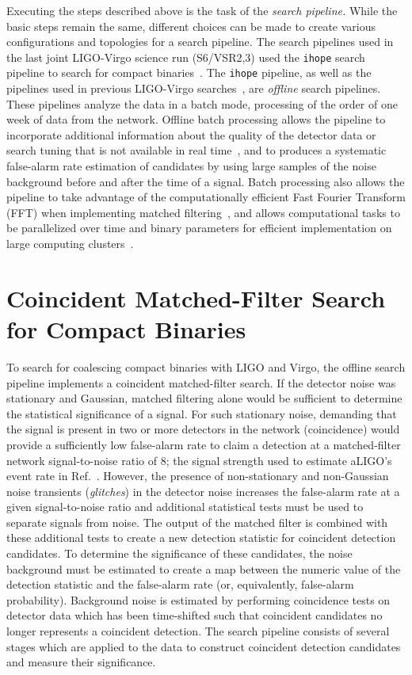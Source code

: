Executing the steps described above is the task of the \emph{search pipeline.}
While the basic steps remain the same, different choices can be made to
create various configurations and topologies for a search pipeline. The search
pipelines used in the last joint LIGO-Virgo science run (S6/VSR2,3) used the
\texttt{ihope} search pipeline to search for compact
binaries~\cite{Babak:2012zx}. The \texttt{ihope} pipeline, as well as the
pipelines used in previous LIGO-Virgo
searches~\cite{Brown:2004pv,Brown:2005zs}, are \emph{offline} search
pipelines. These pipelines analyze the data in a batch mode, processing
of the order of one week of data from the network. Offline batch
processing allows the pipeline to incorporate additional information about the
quality of the detector data or search tuning that is not available in real
time~\cite{Aasi:2012wd,Aasi:2014mqd}, and to produces a systematic false-alarm rate
estimation of candidates by using large samples of the noise background before
and after the time of a signal. Batch processing also allows the pipeline to
take advantage of the computationally efficient Fast Fourier Transform (FFT)
when implementing matched filtering~\cite{Allen:2005fk}, and allows
computational tasks to be parallelized over time and binary parameters for
efficient implementation on large computing clusters~\cite{Brown:workflow}.

\section{Coincident Matched-Filter Search for Compact Binaries}
\label{s:search}

To search for coalescing compact binaries with LIGO and Virgo, the offline search
pipeline implements a coincident matched-filter search.  If the detector noise
was stationary and Gaussian, matched filtering alone would be sufficient to
determine the statistical significance of a signal. For such stationary noise, 
demanding that the signal is present in two or more detectors in the network 
(coincidence) would provide a sufficiently low false-alarm rate to claim a 
detection at a matched-filter network signal-to-noise ratio of 8; the signal 
strength used to estimate aLIGO's event rate in Ref.~\cite{Abadie:2010cf}.
However, the presence of non-stationary and non-Gaussian noise
transients (\emph{glitches})
in the detector noise increases the false-alarm rate at a given
signal-to-noise ratio and additional statistical tests must be used to separate
signals from noise. The output of the matched filter is combined with these
additional tests to create a new detection statistic for coincident detection
candidates. To determine the significance of these candidates, the noise
background must be estimated to create a map between the numeric value of the
detection statistic and the false-alarm rate (or, equivalently, false-alarm
probability). Background noise is estimated by performing coincidence tests on
detector data which has been time-shifted such that coincident candidates no
longer represents a coincident detection. The search pipeline consists of
several stages which are applied to the data to construct coincident detection
candidates and measure their significance. 

